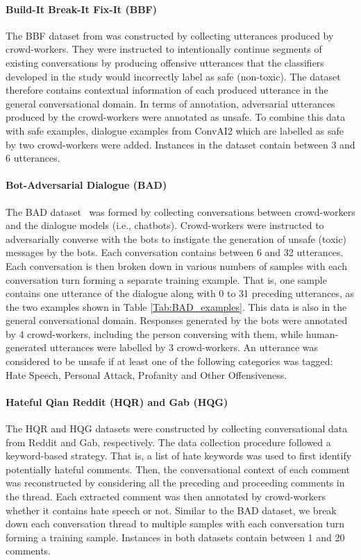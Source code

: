 \documentclass[acmsmall]{acmart}
\begin{document}
\paragraph{\bf Build-It Break-It Fix-It (BBF)}
The BBF dataset from \cite{dialogue_safety} was constructed by collecting utterances produced by crowd-workers. They were instructed to intentionally continue segments of existing conversations by producing offensive utterances that the classifiers developed in the study would incorrectly label as safe (non-toxic). The dataset therefore contains contextual information of each produced utterance in the general conversational domain. In terms of annotation, adversarial utterances produced by the crowd-workers were annotated as unsafe. To combine this data with safe examples, dialogue examples from ConvAI2 \cite{convai2} which are labelled as safe by two crowd-workers were added. Instances in the dataset contain between 3 and 6 utterances.

\paragraph{\bf Bot-Adversarial Dialogue (BAD)} The BAD dataset~\cite{xu-etal-2021-bot} was formed by collecting conversations between crowd-workers and the dialogue models (i.e., chatbots). Crowd-workers were instructed to adversarially converse with the bots to instigate the generation of unsafe (toxic) messages by the bots. Each conversation contains between 6 and 32 utterances. Each conversation is then broken down in various numbers of samples with each conversation turn forming a separate training example. That is, one sample contains one utterance of the dialogue along with 0 to 31 preceding utterances, as the two examples shown in Table \ref{Tab:BAD_examples}. This data is also in the general conversational domain. Responses generated by the bots were annotated by 4 crowd-workers, including the person conversing with them, while human-generated utterances were labelled by 3 crowd-workers. An utterance was considered to be unsafe if at least one of the following categories was tagged: Hate Speech, Personal Attack, Profanity and Other Offensiveness.

\paragraph{\bf Hateful Qian Reddit (HQR) and Gab (HQG)}  The HQR and HQG datasets \cite{hateful_qian} were constructed by collecting conversational data from Reddit and Gab, respectively. The data collection procedure followed a keyword-based strategy. That is, a list of hate keywords was used to first identify potentially hateful comments. Then, the conversational context of each comment was reconstructed by considering all the preceding and proceeding comments in the thread. Each extracted comment was then annotated by crowd-workers whether it contains hate speech or not. Similar to the BAD dataset, we break down each conversation thread to multiple samples with each conversation turn forming a training sample. Instances in both datasets contain between 1 and 20 comments.
\end{document}
